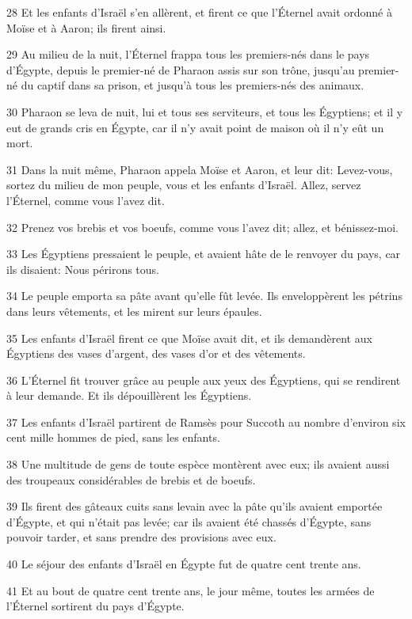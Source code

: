 \par 28 Et les enfants d'Israël s'en allèrent, et firent ce que l'Éternel avait ordonné à Moïse et à Aaron; ils firent ainsi.
\par 29 Au milieu de la nuit, l'Éternel frappa tous les premiers-nés dans le pays d'Égypte, depuis le premier-né de Pharaon assis sur son trône, jusqu'au premier-né du captif dans sa prison, et jusqu'à tous les premiers-nés des animaux.
\par 30 Pharaon se leva de nuit, lui et tous ses serviteurs, et tous les Égyptiens; et il y eut de grands cris en Égypte, car il n'y avait point de maison où il n'y eût un mort.
\par 31 Dans la nuit même, Pharaon appela Moïse et Aaron, et leur dit: Levez-vous, sortez du milieu de mon peuple, vous et les enfants d'Israël. Allez, servez l'Éternel, comme vous l'avez dit.
\par 32 Prenez vos brebis et vos boeufs, comme vous l'avez dit; allez, et bénissez-moi.
\par 33 Les Égyptiens pressaient le peuple, et avaient hâte de le renvoyer du pays, car ils disaient: Nous périrons tous.
\par 34 Le peuple emporta sa pâte avant qu'elle fût levée. Ils enveloppèrent les pétrins dans leurs vêtements, et les mirent sur leurs épaules.
\par 35 Les enfants d'Israël firent ce que Moïse avait dit, et ils demandèrent aux Égyptiens des vases d'argent, des vases d'or et des vêtements.
\par 36 L'Éternel fit trouver grâce au peuple aux yeux des Égyptiens, qui se rendirent à leur demande. Et ils dépouillèrent les Égyptiens.
\par 37 Les enfants d'Israël partirent de Ramsès pour Succoth au nombre d'environ six cent mille hommes de pied, sans les enfants.
\par 38 Une multitude de gens de toute espèce montèrent avec eux; ils avaient aussi des troupeaux considérables de brebis et de boeufs.
\par 39 Ils firent des gâteaux cuits sans levain avec la pâte qu'ils avaient emportée d'Égypte, et qui n'était pas levée; car ils avaient été chassés d'Égypte, sans pouvoir tarder, et sans prendre des provisions avec eux.
\par 40 Le séjour des enfants d'Israël en Égypte fut de quatre cent trente ans.
\par 41 Et au bout de quatre cent trente ans, le jour même, toutes les armées de l'Éternel sortirent du pays d'Égypte.
